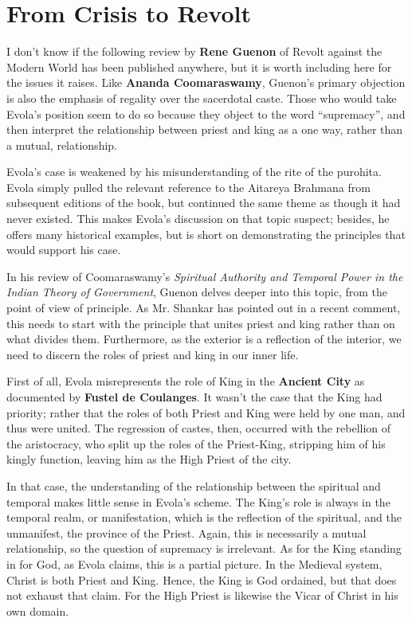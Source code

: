 \section{From Crisis to Revolt}

\begin{quotex}
I don't know if the following review by \textbf{Rene Guenon} of Revolt against the Modern World has been published anywhere, but it is worth including here for the issues it raises. Like \textbf{Ananda Coomaraswamy}, Guenon's primary objection is also the emphasis of regality over the sacerdotal caste. Those who would take Evola's position seem to do so because they object to the word ``supremacy'', and then interpret the relationship between priest and king as a one way, rather than a mutual, relationship.
\end{quotex}


Evola's case is weakened by his misunderstanding of the rite of the purohita. Evola simply pulled the relevant reference to the Aitareya Brahmana from subsequent editions of the book, but continued the same theme as though it had never existed. This makes Evola's discussion on that topic suspect; besides, he offers many historical examples, but is short on demonstrating the principles that would support his case.

In his review of Coomaraswamy's \textit{Spiritual Authority and Temporal Power in the Indian Theory of Government}, Guenon delves deeper into this topic, from the point of view of principle. As Mr. Shankar has pointed out in a recent comment, this needs to start with the principle that unites priest and king rather than on what divides them. Furthermore, as the exterior is a reflection of the interior, we need to discern the roles of priest and king in our inner life.

First of all, Evola misrepresents the role of King in the \textbf{Ancient City} as documented by \textbf{Fustel de Coulanges}. It wasn't the case that the King had priority; rather that the roles of both Priest and King were held by one man, and thus were united. The regression of castes, then, occurred with the rebellion of the aristocracy, who split up the roles of the Priest-King, stripping him of his kingly function, leaving him as the High Priest of the city.

In that case, the understanding of the relationship between the spiritual and temporal makes little sense in Evola's scheme. The King's role is always in the temporal realm, or manifestation, which is the reflection of the spiritual, and the unmanifest, the province of the Priest. Again, this is necessarily a mutual relationship, so the question of supremacy is irrelevant. As for the King standing in for God, as Evola claims, this is a partial picture. In the Medieval system, Christ is both Priest and King. Hence, the King is God ordained, but that does not exhaust that claim. For the High Priest is likewise the Vicar of Christ in his own domain.

